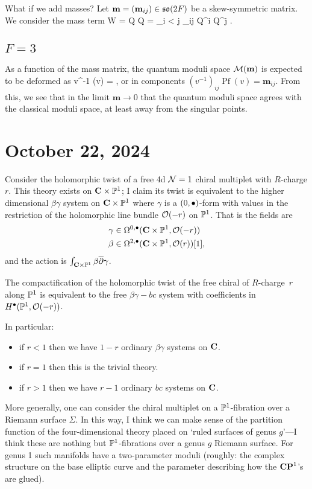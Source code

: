\documentclass[11pt]{amsart}
\renewcommand{\op}{\operatorname}
\newcommand{\bm}{\mathbf{m}}
\begin{document}
What if we add masses?
Let $\bm = (\bm_{ij}) \in \lie{so}(2F)$ be a skew-symmetric matrix.
We consider the mass term
\beqn
W =  \bm Q Q = \sum_{i < j} \bm_{ij} Q^i Q^j .
\eeqn

\subsection{$F = 3$}
As a function of the mass matrix, the quantum moduli space $\cM(\bm)$ is expected to be deformed as
\beqn
v^{-1} \op{Pf}(v) = \bm ,
\eeqn
or in components $(v^{-1})_{ij} \op{Pf}(v) = \bm_{ij}$.
From this, we see that in the limit $\bm \to 0$ that the quantum moduli space agrees with the classical moduli space, at least away from the singular points.

\section{October 22, 2024}

Consider the holomorphic twist of a free 4d $\mathcal N=1$ chiral multiplet with $R$-charge $r$.
This theory exists on $\mathbf{C} \times \mathbb P^1$; I claim its twist is equivalent to the higher dimensional $\beta\gamma$ system on $\mathbf{C} \times \mathbb P^1$ where $\gamma$ is a $(0,\bullet)$-form with values in the restriction of the holomorphic line bundle $\mathcal O(-r)$ on $\mathbb P^1$.
That is the fields are
\begin{align*}
\gamma & \in \Omega^{0,\bullet}(\mathbf{C} \times \mathbb P^1 , \mathcal O(-r)) \\
\beta & \in \Omega^{2,\bullet}(\mathbf{C} \times \mathbb P^1, \mathcal O(r))[1] ,
\end{align*}
and the action is $\int_{\mathbf{C} \times \mathbb P^1} \beta \overline{\partial} \gamma$.

\begin{prop}
The compactification of the holomorphic twist of the free chiral of $R$-charge~$r$ along $\mathbb P^1$ is equivalent to the free $\beta\gamma-bc$ system
with coefficients in $H^\bullet(\mathbb P^1, \mathcal O(-r))$.
\end{prop}

In particular:
\begin{itemize}
\item if $r <1$ then we have $1-r$ ordinary $\beta\gamma$ systems on $\mathbf{C}$.
\item if $r =1$ then this is the trivial theory.
\item if $r > 1$ then we have $r-1$ ordinary $bc$ systems on $\mathbf{C}$.
\end{itemize}

More generally, one can consider the chiral multiplet on a $\mathbb P^1$-fibration over a Riemann surface $\Sigma$.
In this way, I think we can make sense of the partition function of the four-dimensional theory placed on `ruled surfaces of genus $g$'---I think these are nothing but $\mathbb P^1$-fibrations over a genus $g$ Riemann surface. 
For genus 1 such manifolds have a two-parameter moduli (roughly: the complex structure on the base elliptic curve and the parameter describing how the ${\mathbf{CP}}^1$'s are glued).
\end{document}
